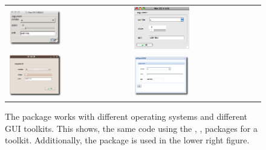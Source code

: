 \begin{figure}
  \centering
  \begin{tabular}{ll}
     \includegraphics[width=0.45\textwidth]{ex-33-macosx-rgtk2} &
     \includegraphics[width=0.45\textwidth]{fig-gWidgets-ex-33-tlctk}\\
    \includegraphics[width=0.45\textwidth]{ex-33-linux-qt} &
     \includegraphics[width=0.45\textwidth]{ex-33-gWidgetsWWW}
 \end{tabular}
 \caption{The  package works with different operating
   systems and different GUI toolkits. This shows, the same code using the
   , ,  packages for a toolkit. Additionally,
   the  package is used in the lower right figure.}
  \label{fig:gWidgets-three-oses}
\end{figure}

